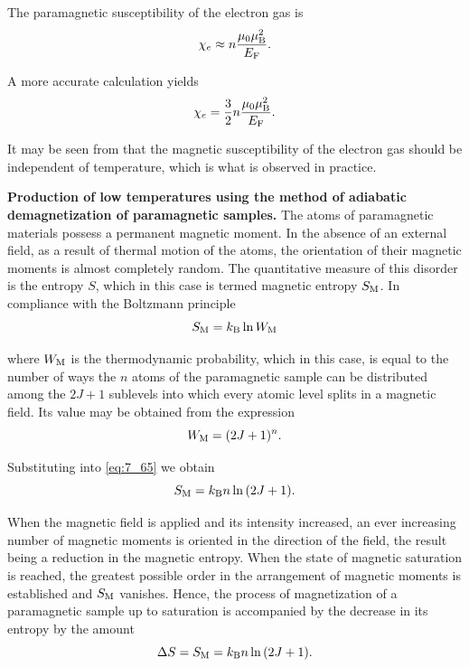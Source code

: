 The paramagnetic susceptibility of the electron gas is
\begin{equation}\label{eq:7_63}
    \chi_e \approx n \frac{\mu_0 \mu_{\text{B}}^2}{E_{\text{F}}}.
\end{equation}

\noindent
A more accurate calculation yields
\begin{equation}\label{eq:7_64}
    \chi_e = \frac{3}{2} n \frac{\mu_0 \mu_{\text{B}}^2}{E_{\text{F}}}.
\end{equation}

It may be seen from  that the magnetic susceptibility of the electron gas should be independent of temperature, which is what is observed in practice.

\textbf{Production of low temperatures using the method of adiabatic demagnetization of paramagnetic samples.} The atoms of paramagnetic materials possess a permanent magnetic moment. In the absence of an external field, as a result of thermal motion of the atoms, the orientation of their magnetic moments is almost completely random. The quantitative measure of this disorder is the entropy $S$, which in this case is termed magnetic entropy $S_{\text{M}}$. In compliance with the Boltzmann principle
\begin{equation}\label{eq:7_65}
    S_{\text{M}} = k_{\text{B}} \ln{W_{\text{M}}}
\end{equation}

\noindent
where $W_{\text{M}}$ is the thermodynamic probability, which in this case, is equal to the number of ways the $n$ atoms of the paramagnetic sample can be distributed among the $2J+1$ sublevels into which every atomic level splits in a magnetic field. Its value may be obtained from the expression
\begin{equation}\label{eq:7_66}
    W_{\text{M}} = (2J + 1)^n.
\end{equation}

\noindent
Substituting  into \eqref{eq:7_65} we obtain
\begin{equation}\label{eq:7_67}
    S_{\text{M}} = k_{\text{B}} n \ln{(2J + 1)}.
\end{equation}

When the magnetic field is applied and its intensity increased, an ever increasing number of magnetic moments is oriented in the direction of the field, the result being a reduction in the magnetic entropy. When the state of magnetic saturation is reached, the greatest possible order in the arrangement of magnetic moments is established and $S_{\text{M}}$ vanishes. Hence, the process of magnetization of a paramagnetic sample up to saturation is accompanied by the decrease in its entropy by the amount
\begin{equation}\label{eq:7_68}
    \Delta{S} = S_{\text{M}} = k_{\text{B}} n \ln{(2J + 1)}.
\end{equation}

